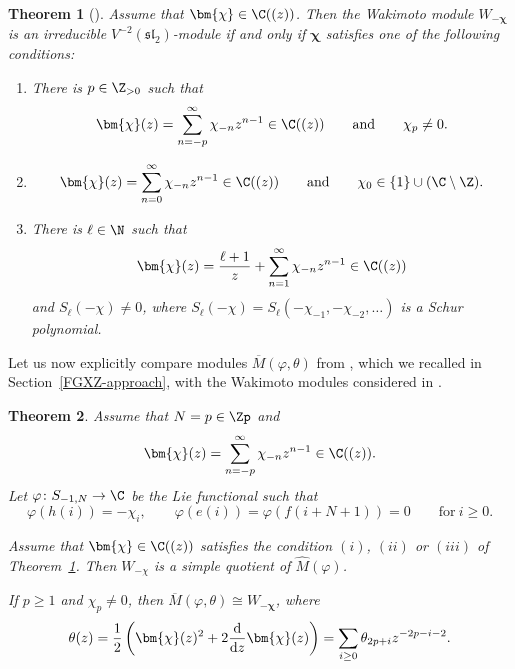 \documentclass[pdftex]{sigma}
\numberwithin{equation}{section}
\newtheorem{Theorem}{Theorem}[section]
\theoremstyle{definition}
\newcommand{\1}{\textbf{1}}
\begin{document}
\begin{Theorem}[\cite{A-07, A-14}] \label{A14}
Assume that $\bm{\chi} \in {\C}((z))$. Then the Wakimoto module
$W_{-\bm{\chi}}$ is an irreducible $V^{-2}(\mathfrak{sl}_2)$-module if and only
if $\bm{\chi}$ satisfies one of the following conditions:
\begin{enumerate}\itemsep=0pt
\item[$(i)$] There is $p \in {\Z}_{>0}$
 such that
\[ \bm{\chi}(z) = \sum_{n=-p} ^{\infty} {\chi}_{-n} z ^{n-1} \in
{\C}((z)) \qquad \mbox{and} \qquad
\chi_p \ne 0. \]

\item[$(ii)$] \[ \bm{\chi}(z) = \sum_{n=0} ^{\infty} {\chi}_{-n} z
^{n-1} \in {\C}((z)) \qquad \mbox{and} \qquad
\chi_0 \in \{1 \} \cup ({\C} \setminus {\Z}). \]
\item[$(iii)$] There is $\ell \in {\N}$ such that
\[ \bm{\chi}(z) = \frac{\ell +1}{z} + \sum_{n=1} ^{\infty} {\chi}_{-n} z ^{n-1} \in
{\C}((z))\]
and $S_{\ell}(-\chi) \ne 0$,
where $S_{\ell}(-\chi) = S_{\ell}(-\chi_{-1}, -\chi_{-2}, \dots)$
is a Schur polynomial.
\end{enumerate}
\end{Theorem}

Let us now explicitly compare modules $\overline M(\varphi, \theta )$ from \cite{FGXZ}, which we recalled in Section~\ref{FGXZ-approach}, with the Wakimoto modules considered in \cite{A-07, A-14}.

\begin{Theorem} \label{krit-kvocijenti}
 Assume that $N=p \in {\Zp}$ and
 \[ \bm{\chi}(z) = \sum_{n=-p} ^{\infty} {\chi}_{-n} z ^{n-1} \in
{\C}((z)). \]
Let $\varphi \colon S_{-1, N} \rightarrow {\C}$ be the Lie functional such that \[\varphi(h(i)) = -\chi_i, \qquad \varphi(e(i)) = \varphi(f(i+N+1)) =0 \qquad \mbox{for} \ i \ge 0. \]

Assume that $\bm{\chi} \in {\C}((z))$ satisfies the condition $(i)$, $(ii)$ or $(iii)$ of Theorem~{\rm \ref{A14}}. Then $W_{-\chi}$ is a simple quotient of $\widehat M( \varphi)$.

 If $p\ge 1$ and $\chi_p \ne 0$, then
 $\overline M(\varphi, \theta) \cong W_{-\bm{\chi}}$, where
 \[ \theta(z) = \frac{1}{2} \left( \bm{\chi}(z) ^2 + 2 \frac{{\rm d}}{{\rm d} z}\bm{\chi} (z) \right) = \sum_{i\ge 0} \theta_{2p +i} z^{-2 p- i - 2}. \]
 \end{Theorem}
\end{document}
